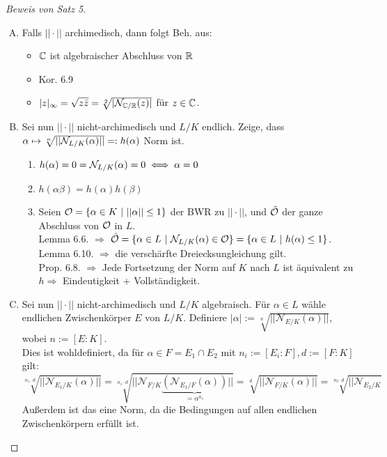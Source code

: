 \begin{proof}[Beweis von Satz 5]
\begin{enumerate}[(A)]
\item Falls $||\cdot||$ archimedisch, dann folgt Beh. aus:
\begin{itemize}
\item $\mathbb{C}$ ist algebraischer Abschluss von $\mathbb{R}$
\item Kor. 6.9
\item $|z|_\infty = \sqrt{z \bar{z}} = \sqrt[2]{|\mathcal{N}_{\mathbb{C}/\mathbb{R}}(z)|}$ für $z \in \mathbb{C}$.
\end{itemize}
\item Sei nun $||\cdot||$ nicht-archimedisch und $L/K$ endlich. Zeige, dass $\alpha \mapsto \sqrt[n]{||\mathcal{N}_{L/K}(\alpha)||}=:h(\alpha)$ Norm ist.
\begin{enumerate}[(1)]
\item $h(\alpha)=0=\mathcal{N}_{L/K}(\alpha)=0 \iff \alpha=0$
\item $h(\alpha\beta)=h(\alpha)h(\beta)$
\item Seien $\O=\{\alpha \in K \ | \ ||\alpha|| \leq 1 \}$ der BWR zu $||\cdot||$, und $\hat{\mathcal{O}}$ der ganze Abschluss von $\mathcal{O}$ in $L$.\\
Lemma 6.6. $\Rightarrow$ $\hat{\mathcal{O}}=\{\alpha \in L \ | \ \mathcal{N}_{L/K}(\alpha) \in \mathcal{O}\} = \{\alpha \in L \ | \ h(\alpha) \leq 1\}$.\\
Lemma 6.10. $\Rightarrow$ die verschärfte Dreiecksungleichung gilt.\\
Prop. 6.8. $\Rightarrow$ Jede Fortsetzung der Norm auf $K$ nach $L$ ist äquivalent zu $h \Rightarrow$ Eindeutigkeit + Vollständigkeit.
\end{enumerate}
\item Sei nun $|| \cdot||$ nicht-archimedisch und $L/K$ algebraisch. Für $\alpha \in L$ wähle endlichen Zwischenkörper $E$ von $L/K$. Definiere $|\alpha|:=\sqrt[n]{||\mathcal{N}_{E/K}(\alpha)||}$, wobei $n:=[E:K]$.\\
Dies ist wohldefiniert, da für $\alpha \in F=E_1 \cap E_2$ mit $n_i:=[E_i : F], d:=[F:K]$ gilt:
\[\sqrt[n_1\cdot d]{|| \mathcal{N}_{E_1/K} (\alpha)||}=\sqrt[n_1\cdot d]{|| \mathcal{N}_{F/K}\underbrace{(\mathcal{N}_{E_1/F} (\alpha))}_{=\alpha^{n_1}}||}=\sqrt[d]{||\mathcal{N}_{F/K}(\alpha)||}=\sqrt[n_2\cdot d]{|| \mathcal{N}_{E_2/K}}\]
Außerdem ist das eine Norm, da die Bedingungen auf allen endlichen Zwischenkörpern erfüllt ist.
\end{enumerate}
\end{proof}

